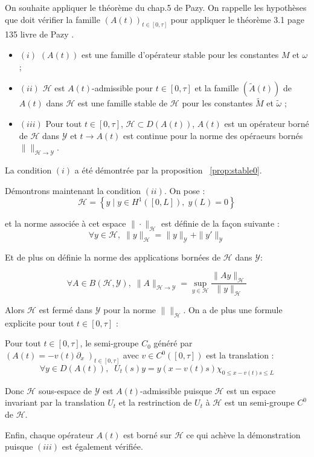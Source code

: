 \documentclass[a4paper]{article}
\begin{document}
\begin{preuve}
	On souhaite appliquer le théorème du chap.5 de Pazy.
	On rappelle les hypothèses que doit vérifier la famille $(A(t))_{t \in [0,\tau]}$ pour appliquer 
	le théorème 3.1 page 135 livre de Pazy \cite{APazy}.
	\begin{itemize}
		\item $(i)$ $(A(t))$ est une famille d'opérateur stable pour les constantes $M$ et $\omega$ ;
		\item $(ii)$ $\mathscr{H}$ est $A(t)$-admissible pour $t \in [0,\tau]$ et la famille $(\tilde{A}(t))$
		de $A(t)$ dans $\mathscr{H}$ est une famille stable de $\mathscr{H}$ 
		pour les constantes $\tilde{M}$ et $\tilde{\omega}$ ;
		\item $(iii)$ Pour tout $t \in[0,\tau]$, $\mathscr{H} \subset D(A(t))$, $A(t)$ est un opérateur borné
		de $\mathscr{H}$ dans $\mathscr{Y}$ et $t \to A(t)$ est continue 
		pour la norme des opéraeurs bornés $\| \|_{\mathscr{H}\to \mathscr{Y}}$.
	\end{itemize}
	
	\vspace{0.3cm}
	La condition $(i)$ a été démontrée par la proposition ~\ref{prop:stable0}.
	
	\vspace{0.3cm}
	Démontrons maintenant la condition $(ii)$.
	On pose :
	\[\mathscr{H} = \left\{ y \; | \; y\in H^1([0,L]), \; y(L)=0 \right\} \]
	 
	  et la norme associée à cet espace $\| \cdot \|_{\mathscr{H}}$ est définie de la façon suivante :
	\[ \forall y \in \mathscr{H}, \; \|y\|_{\mathscr{H}} = \|y\|_{\mathscr{Y}} + \|y'\|_{\mathscr{Y}} \]
	
	Et de plus on définie la norme des applications bornées de $\mathscr{H}$ dans $\mathscr{Y}$:
	
	\[ \forall A \in B(\mathscr{H},\mathscr{Y}), 
	\; \| A \|_{\mathscr{H}\to \mathscr{Y}} =\sup_{y\in\mathscr{H}} \frac{\|Ay\|_{\mathscr{H}}}{\|y\|_{\mathscr{H}}} \]
	
	Alors $\mathscr{H}$ est fermé dans $\mathscr{Y}$ pour la norme $\| \|_{\mathscr{H}}$.
	On a de plus une formule explicite pour tout $t\in [0,\tau]$ :
	
	\begin{lemme}
		Pour tout $t\in[0,\tau]$, le semi-groupe $C_0$ généré par $(A(t)= - v(t)\partial_x \;)_{t \in [0,\tau]}$
		avec $v \in C^0([0,\tau])$ est la translation :
		\[ \forall y \in D(A(t)), \; \; U_t(s)y = y(x - v(t)s)\chi_{0\leq x-v(t)s \leq L} \]
	\end{lemme}
	
	Donc $\mathscr{H}$ sous-espace de $\mathscr{Y}$ est $A(t)$-admissible 
	puisque $\mathscr{H}$ est un espace invariant par la translation $U_t$
	et la restrinction de $U_t$ à $\mathscr{H}$ est un semi-groupe $C^0$ de $\mathscr{H}$.
	
	Enfin, chaque opérateur $A(t)$ est borné sur $\mathscr{H}$ ce qui achève la démonstration puisque $(iii)$ est également vérifiée.
\end{preuve}
\end{document}

